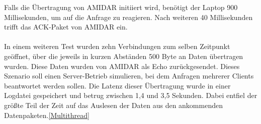 Falls die Übertragung von AMIDAR initiiert wird, benötigt der Laptop 900 Millisekunden, um auf die Anfrage zu reagieren. Nach weiteren 40 Millisekunden trifft das ACK-Paket von AMIDAR ein.\\\\
In einem weiteren Test wurden zehn Verbindungen zum selben Zeitpunkt geöffnet, über die jeweils in kurzen Abständen 500 Byte an Daten übertragen wurden. Diese Daten wurden von AMIDAR als Echo zurückgesendet. Dieses Szenario soll einen Server-Betrieb simulieren, bei dem Anfragen mehrerer Clients beantwortet werden sollen. Die Latenz dieser Übertragung wurde in einer Logdatei gespeichert und betrug zwischen 1,4 und 3,5 Sekunden. Dabei entfiel der größte Teil der Zeit auf das Auslesen der Daten aus den ankommenden Datenpaketen.\autoref{Multithread}\\

